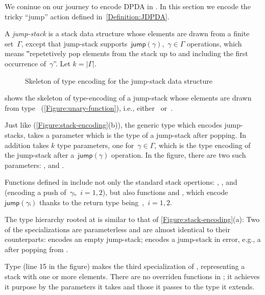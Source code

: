 We coninue on our journey to encode DPDA in \Java.
In this section we encode the tricky ``jump'' action defined in~\cref{Definition:JDPDA}.

A \emph{jump-stack} is a stack data structure whose elements are drawn from a finite set~$Γ$,
  except that jump-stack supports~$\textsf{jump}(γ)$,~$γ∈Γ$ operations,
    which means
  ‟repetetively pop elements from the stack up to and including the first occurrence of~$γ$”.
Let $k=|\Gamma|$. 

\begin{wrapfigure}[16]{r}{42ex}
  \caption{Skeleton of type encoding for the jump-stack data structure}%
  \label{Figure:jump}%
  \lstset{style=numbered}
\end{wrapfigure}

 shows the skeleton of type-encoding of a jump-stack whose
elements are drawn from type~
(\cref{Figure:unary-function}), i.e., either~ or~.

Just like  (\cref{Figure:stack-encoding}(b)),
  the generic type  which encodes jump-stacks, takes
  a  parameter which is the type of a jump-stack after popping.
In addition  takes $k$ type parameters, one for~$γ∈Γ$,
  which is the type encoding of the jump-stack after a~$\textsf{jump}(γ)$
  operation.
In the figure, there are two such parameters: , and
  .

Functions defined in  include not only the standard stack opertions: ,
,  and~ (encoding a push of~$γᵢ$,~$i=1,2$),
  but also functions  and ,
  which encode~$\textsf{jump}(γᵢ)$
  thanks to the return type being~,~$i=1,2$.

The type hierarchy rooted at  is similar to that of
\cref{Figure:stack-encoding}(a):
  Two of the specializations are parameterless and are
  almost identical to their 
  counterparts:
 encodes an empty jump-stack;  encodes a jump-stack in error,
e.g., a after popping from .



Type  (line 15 in the figure) makes  the third specialization of , representing 
  a stack with one or more elements.
There are no overriden functions in ; it achieves
  it purpose by the parameters it takes and those it passes
  to the type it extends.

